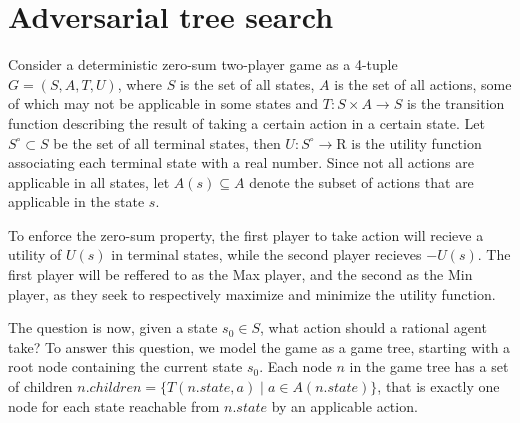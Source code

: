 \section{Adversarial tree search}

Consider a deterministic zero-sum two-player game as a 4-tuple 
$G = (S, A, T, U)$, where $S$ is the set of all states, $A$ is the
set of all actions, some of which may not be applicable in some
states and $T: S \times A \rightarrow S$ is the transition function
describing the result of taking a certain action in a certain state.
Let $S^\circ \subset S$ be the set of all terminal states, 
then $U: S^\circ \rightarrow \mathrm{R}$ is the utility function 
associating each terminal state with a real number. Since not all
actions are applicable in all states, let $A(s) \subseteq A$ denote
the subset of actions that are applicable in the state $s$.

To enforce the zero-sum property, the first player to take action will
recieve a utility of $U(s)$ in terminal states, while the second player
recieves $-U(s)$. The first player will be reffered to as the Max player,
and the second as the Min player, as they seek to respectively maximize 
and minimize the utility function.

The question is now, given a state $s_0 \in S$, what action should
a rational agent take? To answer this question, we model the game
as a game tree, starting with a root node containing the current state
$s_0$. Each node $n$ in the game tree has a set of children
$n.children = \{ T(n.state, a) \; | \; a \in A(n.state) \}$, that
is exactly one node for each state reachable from $n.state$ by 
an applicable action.


